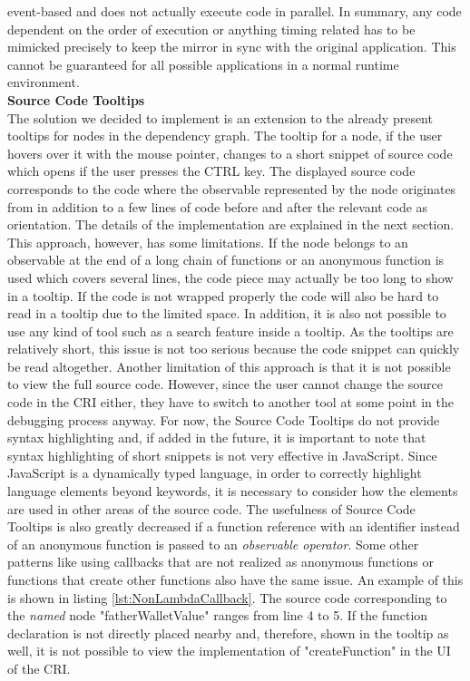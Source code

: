 event-based \cite{EventBasedJS} and does not actually execute code in parallel. In summary, any code dependent on the order of execution or anything timing related has to be mimicked precisely to keep the mirror in sync with the original application. This cannot be guaranteed for all possible applications in a normal runtime environment. \\
 
\textbf{Source Code Tooltips}\\
The solution we decided to implement is an extension to the already present tooltips for nodes in the dependency graph. The tooltip for a node, if the user hovers over it with the mouse pointer, changes to a short snippet of source code which opens if the user presses the CTRL key. The displayed source code corresponds to the code where the observable represented by the node originates from in addition to a few lines of code before and after the relevant code as orientation. The details of the implementation are explained in the next section. This approach, however, has some limitations. If the node belongs to an observable at the end of a long chain of functions or an anonymous function is used which covers several lines, the code piece may actually be too long to show in a tooltip. If the code is not wrapped properly the code will also be hard to read in a tooltip due to the limited space. In addition, it is also not possible to use any kind of tool such as a search feature inside a tooltip. As the tooltips are relatively short, this issue is not too serious because the code snippet can quickly be read altogether. Another limitation of this approach is that it is not possible to view the full source code. However, since the user cannot change the source code in the CRI either, they have to switch to another tool at some point in the debugging process anyway. For now, the Source Code Tooltips do not provide syntax highlighting and, if added in the future, it is important to note that syntax highlighting of short snippets is not very effective in JavaScript. Since JavaScript is a dynamically typed language, in order to correctly highlight language elements beyond keywords, it is necessary to consider how the elements are used in other areas of the source code. The usefulness of Source Code Tooltips is also greatly decreased if a function reference with an identifier instead of an anonymous function is passed to an \emph{observable operator}. Some other patterns like using callbacks that are not realized as anonymous functions or functions that create other functions also have the same issue. An example of this is shown in listing \ref{lst:NonLambdaCallback}. The source code corresponding to the \emph{named} node "fatherWalletValue" ranges from line 4 to 5. If the function declaration is not directly placed nearby and, therefore, shown in the tooltip as well, it is not possible to view the implementation of "createFunction" in the UI of the CRI.

